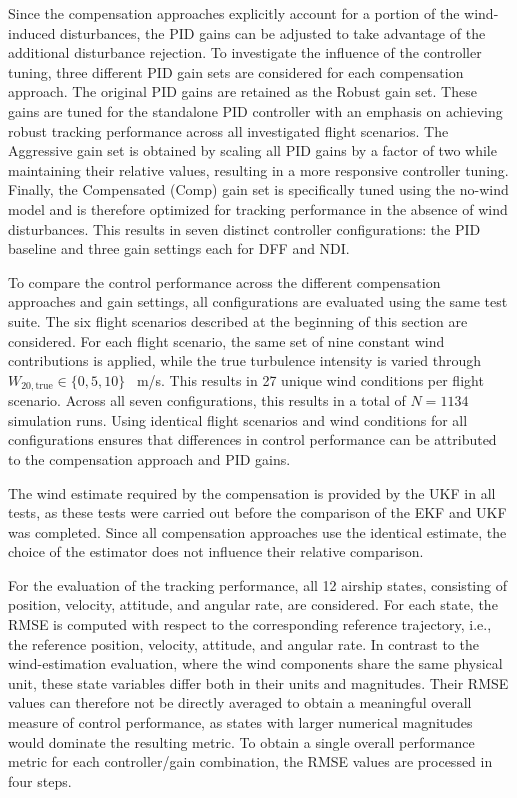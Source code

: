 Since the compensation approaches explicitly account for a portion of the wind-induced disturbances, the PID gains can be adjusted to take advantage of the additional disturbance rejection. To investigate the influence of the controller tuning, three different PID gain sets are considered for each compensation approach. The original PID gains are retained as the Robust gain set. These gains are tuned for the standalone PID controller with an emphasis on achieving robust tracking performance across all investigated flight scenarios. The Aggressive gain set is obtained by scaling all PID gains by a factor of two while maintaining their relative values, resulting in a more responsive controller tuning. Finally, the Compensated (Comp) gain set is specifically tuned using the no-wind model and is therefore optimized for tracking performance in the absence of wind disturbances. This results in seven distinct controller configurations: the PID baseline and three gain settings each for DFF and NDI.

To compare the control performance across the different compensation approaches and gain settings, all configurations are evaluated using the same test suite. The six flight scenarios described at the beginning of this section are considered. For each flight scenario, the same set of nine constant wind contributions is applied, while the true turbulence intensity is varied through $W_{20,\mathrm{true}} \in \{0,5,10\}$ \SI{}{m/s}.
This results in 27 unique wind conditions per flight scenario. Across all seven configurations, this results in a total of $N = 1134$ simulation runs. Using identical flight scenarios and wind conditions for all configurations ensures that differences in control performance can be attributed to the compensation approach and PID gains.

The wind estimate required by the compensation is provided by the UKF in all tests, as these tests were carried out before the comparison of the EKF and UKF was completed. Since all compensation approaches use the identical estimate, the choice of the estimator does not influence their relative comparison.

For the evaluation of the tracking performance, all 12 airship states, consisting of position, velocity, attitude, and angular rate, are considered. For each state, the RMSE is computed with respect to the corresponding reference trajectory, i.e., the reference position, velocity, attitude, and angular rate. In contrast to the wind-estimation evaluation, where the wind components share the same physical unit, these state variables differ both in their units and magnitudes. Their RMSE values can therefore not be directly averaged to obtain a meaningful overall measure of control performance, as states with larger numerical magnitudes would dominate the resulting metric.
To obtain a single overall performance metric for each controller/gain combination, the RMSE values are processed in four steps.

